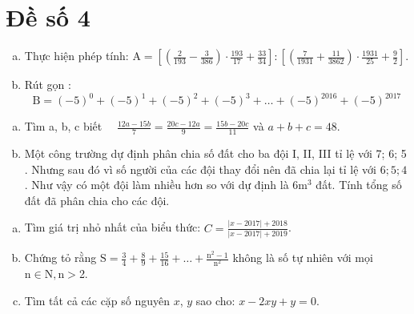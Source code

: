 \graphicspath{{./img/}}
\section{Đề số 4}

\begin{bt} 
   \hfill
   \begin{enumerate}[a.]
    \item Thực hiện phép tính: $\mathrm{A}=\left[\left(\frac{2}{193}-\frac{3}{386}\right) \cdot \frac{193}{17}+\frac{33}{34}\right]:\left[\left(\frac{7}{1931}+\frac{11}{3862}\right) \cdot \frac{1931}{25}+\frac{9}{2}\right]$.
    \item Rút gọn :    
    $$
    \mathrm{B}=(-5)^0+(-5)^1+(-5)^2+(-5)^3+\ldots+(-5)^{2016}+(-5)^{2017}
    $$
   \end{enumerate}
\loigiai{} 
\end{bt}

\begin{bt}
    \hfill
    \begin{enumerate}[a.]
        \item Tìm a, b, c biết $\quad \frac{12 a-15 b}{7}=\frac{20 c-12 a}{9}=\frac{15 b-20 c}{11}$ và $a+b+c=48$.
        \item Một công trường dự định phân chia số đất cho ba đội I, II, III tỉ lệ với 7; 6; 5 . Nhưng sau đó vì số người của các đội thay đổi nên đã chia lại tỉ lệ với $6 ; 5 ; 4$. Như vậy có một đội làm nhiều hơn so với dự định là $6 \mathrm{m}^3$ đất. Tính tổng số đất đã phân chia cho các đội.
    \end{enumerate}
\loigiai{} 
\end{bt}

\begin{bt}
   \hfill
   \begin{enumerate}[a.]
    \item Tìm giá trị nhỏ nhất của biểu thức: $C=\frac{|x-2017|+2018}{|x-2017|+2019}$.
    \item Chứng tỏ rằng $\mathrm{S}=\frac{3}{4}+\frac{8}{9}+\frac{15}{16}+\ldots+\frac{\mathrm{n}^2-1}{\mathrm{n}^2}$ không là số tự nhiên với mọi $\mathrm{n} \in \mathrm{N}, \mathrm{n}>$2.
    \item Tìm tất cả các cặp số nguyên $x$, $y$ sao cho: $x-2 x y+y=0$.
   \end{enumerate}
\loigiai{} 
\end{bt}

